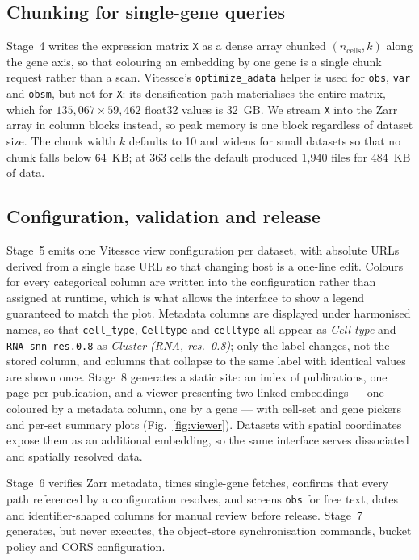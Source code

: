 \subsection{Chunking for single-gene queries}

Stage~4 writes the expression matrix \texttt{X} as a dense array chunked
$(n_\mathrm{cells}, k)$ along the gene axis, so that colouring an embedding by
one gene is a single chunk request rather than a scan. Vitessce's
\texttt{optimize\_adata} helper is used for \texttt{obs}, \texttt{var} and
\texttt{obsm}, but not for \texttt{X}: its densification path materialises the
entire matrix, which for $135{,}067 \times 59{,}462$ float32 values is 32~GB. We
stream \texttt{X} into the Zarr array in column blocks instead, so peak memory
is one block regardless of dataset size. The chunk width $k$ defaults to 10 and
widens for small datasets so that no chunk falls below 64~KB; at 363 cells the
default produced 1{,}940 files for 484~KB of data.

\subsection{Configuration, validation and release}

Stage~5 emits one Vitessce view configuration per dataset, with absolute URLs
derived from a single base URL so that changing host is a one-line edit.
Colours for every categorical column are written into the configuration rather
than assigned at runtime, which is what allows the interface to show a legend
guaranteed to match the plot. Metadata columns are displayed under harmonised
names, so that \texttt{cell\_type}, \texttt{Celltype} and \texttt{celltype}
all appear as \emph{Cell type} and \texttt{RNA\_snn\_res.0.8} as
\emph{Cluster (RNA, res.~0.8)}; only the label changes, not the stored column,
and columns that collapse to the same label with identical values are shown
once. Stage~8 generates a static site: an index of
publications, one page per publication, and a viewer presenting two linked
embeddings --- one coloured by a metadata column, one by a gene --- with
cell-set and gene pickers and per-set summary plots (Fig.~\ref{fig:viewer}).
Datasets with spatial coordinates expose them as an additional embedding, so the
same interface serves dissociated and spatially resolved data.

Stage~6 verifies Zarr metadata, times single-gene fetches, confirms that every
path referenced by a configuration resolves, and screens \texttt{obs} for free
text, dates and identifier-shaped columns for manual review before release.
Stage~7 generates, but never executes, the object-store synchronisation
commands, bucket policy and CORS configuration.

